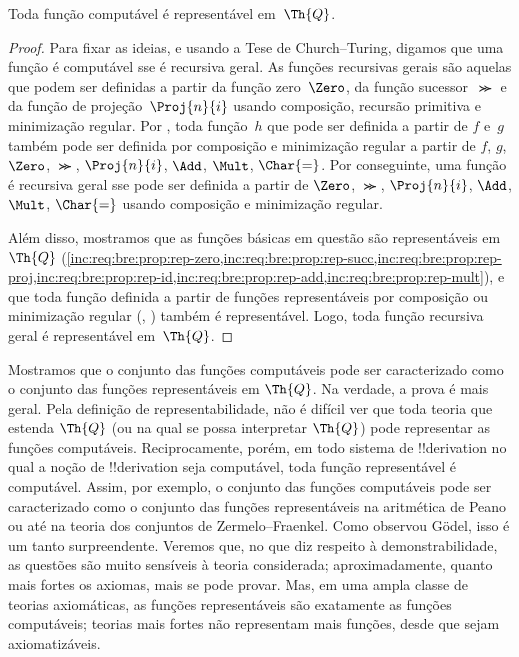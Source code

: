 \documentclass[../../../include/open-logic-section]{subfiles}
\begin{document}

\begin{thm}
Toda função computável é representável em~$\Th{Q}$.
\end{thm}

\begin{proof}
Para fixar as ideias, e usando a Tese de Church--Turing, digamos que
uma função é computável sse é recursiva geral. As funções recursivas
gerais são aquelas que podem ser definidas a partir da função
zero~$\Zero$, da função sucessor~$\Succ$ e da função de
projeção~$\Proj{n}{i}$ usando composição, recursão primitiva e
minimização regular. Por , toda função~$h$ que
pode ser definida a partir de $f$ e~$g$ também pode ser definida por
composição e minimização regular a partir de $f$, $g$, $\Zero$,
$\Succ$, $\Proj{n}{i}$, $\Add$, $\Mult$, $\Char{=}$. Por conseguinte,
uma função é recursiva geral sse pode ser definida a partir de $\Zero$,
$\Succ$, $\Proj{n}{i}$, $\Add$, $\Mult$, $\Char{=}$ usando composição
e minimização regular.

Além disso, mostramos que as funções básicas em questão são
representáveis em~$\Th{Q}$
(\cref{inc:req:bre:prop:rep-zero,inc:req:bre:prop:rep-succ,inc:req:bre:prop:rep-proj,inc:req:bre:prop:rep-id,inc:req:bre:prop:rep-add,inc:req:bre:prop:rep-mult}),
e que toda função definida a partir de funções representáveis por
composição ou minimização regular
(,
) também é representável. Logo, toda
função recursiva geral é representável em~$\Th{Q}$.
\end{proof}

\begin{explain}
Mostramos que o conjunto das funções computáveis pode ser
caracterizado como o conjunto das funções representáveis em $\Th{Q}$.
Na verdade, a prova é mais geral. Pela definição de representabilidade,
não é difícil ver que toda teoria que estenda $\Th{Q}$ (ou na qual se
possa interpretar $\Th{Q}$) pode representar as funções computáveis.
Reciprocamente, porém, em todo sistema de !!{derivation} no qual a
noção de !!{derivation} seja computável, toda função representável é
computável. Assim, por exemplo, o conjunto das funções computáveis pode
ser caracterizado como o conjunto das funções representáveis na
aritmética de Peano ou até na teoria dos conjuntos de Zermelo--Fraenkel.
Como observou G\"odel, isso é um tanto surpreendente. Veremos que, no
que diz respeito à demonstrabilidade, as questões são muito sensíveis
à teoria considerada; aproximadamente, quanto mais fortes os axiomas,
mais se pode provar. Mas, em uma ampla classe de teorias axiomáticas,
as funções representáveis são exatamente as funções computáveis;
teorias mais fortes não representam mais funções, desde que sejam
axiomatizáveis.
\end{explain}
\end{document}
